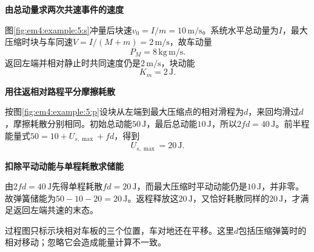 \begin{solution}\textbf{由总动量求两次共速事件的速度}\par\nobreak
图\ref{fig:em4:example:5:s}冲量后块速$v_0=I/m=10\,\mathrm{m/s}$。系统水平总动量为$I$，最大压缩时块与车同速$V=I/(M+m)=2\,\mathrm{m/s}$，故车动量
\[\boxed{P_M=8\,\mathrm{kg\,m/s}}.\]
返回左端并相对静止时共同速度仍是$2\,\mathrm{m/s}$，块动能
\[\boxed{K_m=2\,\mathrm J}.\]




\par\medskip{}\noindent\textbf{用往返相对路程平分摩擦耗散}\par\nobreak
按图\ref{fig:em4:example:5:p}设块从左端到最大压缩点的相对滑程为$d$，来回均滑过$d$，摩擦耗散分别相同。初始总动能$50\,\mathrm J$，最后总动能$10\,\mathrm J$，所以$2fd=40\,\mathrm J$。前半程能量式$50=10+U_{s,\max}+fd$，得到
\[\boxed{U_{s,\max}=20\,\mathrm J}.\]


\par\medskip{}\noindent\textbf{扣除平动动能与单程耗散求储能}\par\nobreak
由$2fd=40\,\mathrm J$先得单程耗散$fd=20\,\mathrm J$，而最大压缩时平动动能仍是$10\,\mathrm J$，并非零。故弹簧储能为$50-10-20=20\,\mathrm J$。返程释放这$20\,\mathrm J$，又恰好耗散同样的$20\,\mathrm J$，才满足返回左端共速的末态。

过程图只标示块相对车板的三个位置，车对地还在平移。这里$d$包括压缩弹簧时的相对移动；忽略它会造成能量计算不一致。\end{solution}
